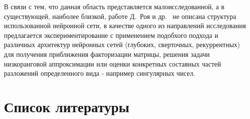 В связи с тем, что данная область представляется малоисследованной, а в существующей, наиболее близкой, работе Д.~Роя и др.~\cite{nnFactorization} не описана структура использованной нейронной сети, в качестве одного из направлений исследования предлагается экспериментирование с применением подобхого подхода и различных архитектур нейронных сетей (глубоких, сверточных, рекуррентных) для получения приближения факторизации матрицы, решения задачи низкоранговой аппроксимации или оценки конкретных составных частей разложений определенного вида - например сингулярных чисел. 


\nocite{*}
\section*{Список литературы}
\printbibliography[heading=none]

